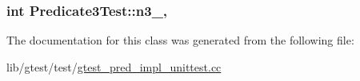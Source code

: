 \hypertarget{class_predicate3_test_afc1df6b079ffe22b87479b161d2ad2f7}{
\subsubsection[{n3\-\_\-}]{\setlength{\rightskip}{0pt plus 5cm}int Predicate3\-Test\-::n3\-\_\-\hspace{0.3cm}{\ttfamily [static]}, {\ttfamily [protected]}}}\label{class_predicate3_test_afc1df6b079ffe22b87479b161d2ad2f7}


The documentation for this class was generated from the following file\-:\begin{DoxyCompactItemize}
\item 
lib/gtest/test/\hyperlink{gtest__pred__impl__unittest_8cc}{gtest\-\_\-pred\-\_\-impl\-\_\-unittest.\-cc}\end{DoxyCompactItemize}
